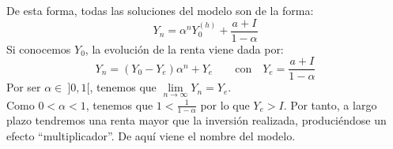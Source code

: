 De esta forma, todas las soluciones del modelo son de la forma:
\begin{equation*}
    Y_n = \alpha^n Y_0^{(h)} + \dfrac{a+I}{1-\alpha}
\end{equation*}
Si conocemos $Y_0$, la evolución de la renta viene dada por:
\begin{equation*}
    Y_n = (Y_0 - Y_e)\alpha^n+ Y_e \qquad \text{con}\quad Y_e = \dfrac{a+I}{1-\alpha}
\end{equation*}
Por ser $\alpha \in~]0,1[$, tenemos que $\lim\limits_{n\to \infty} Y_n = Y_e$.\\

Como $0<\alpha<1$, tenemos que $1 < \frac{1}{1-\alpha}$ por lo que $Y_e>I$. Por tanto, a largo plazo tendremos una renta mayor que la inversión realizada, produciéndose un efecto ``multiplicador''. De aquí viene el nombre del modelo.

